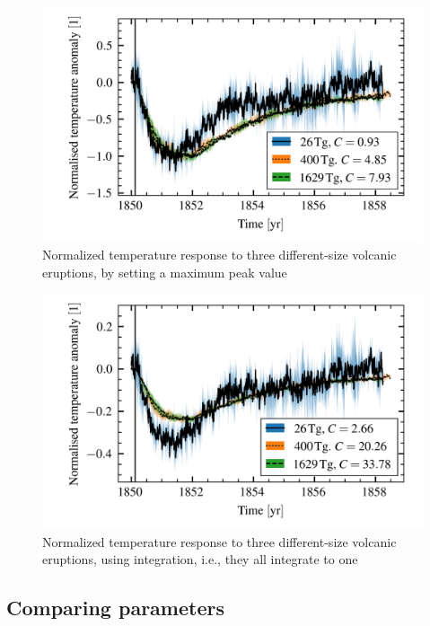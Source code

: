 \documentclass{ametsocV5}
\begin{document}
\begin{figure}[t]
  \begin{center}
    \includegraphics[width=0.95\linewidth]{figures/compare-waveform-max.png}
  \end{center}
  \caption{Normalized temperature response to three different-size volcanic eruptions,
    by setting a maximum peak value}%
  \label{fig:temp_norm_max}
\end{figure}

\begin{figure}[t]
  \begin{center}
    \includegraphics[width=0.95\linewidth]{figures/compare-waveform-integrate.png}
  \end{center}
  \caption{Normalized temperature response to three different-size volcanic eruptions,
    using integration, i.e., they all integrate to one}%
  \label{fig:temp_norm_int}
\end{figure}

\subsection{Comparing parameters}
\end{document}
